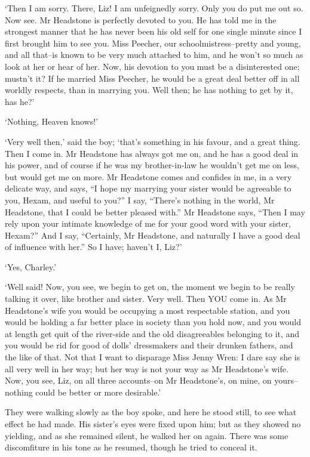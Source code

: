 ‘Then I am sorry. There, Liz! I am unfeignedly sorry. Only you do put me
out so. Now see. Mr Headstone is perfectly devoted to you. He has told
me in the strongest manner that he has never been his old self for one
single minute since I first brought him to see you. Miss Peecher, our
schoolmistress--pretty and young, and all that--is known to be very much
attached to him, and he won’t so much as look at her or hear of her.
Now, his devotion to you must be a disinterested one; mustn’t it? If he
married Miss Peecher, he would be a great deal better off in all worldly
respects, than in marrying you. Well then; he has nothing to get by it,
has he?’

‘Nothing, Heaven knows!’

‘Very well then,’ said the boy; ‘that’s something in his favour, and a
great thing. Then I come in. Mr Headstone has always got me on, and he
has a good deal in his power, and of course if he was my brother-in-law
he wouldn’t get me on less, but would get me on more. Mr Headstone
comes and confides in me, in a very delicate way, and says, “I hope my
marrying your sister would be agreeable to you, Hexam, and useful to
you?” I say, “There’s nothing in the world, Mr Headstone, that I could
be better pleased with.” Mr Headstone says, “Then I may rely upon your
intimate knowledge of me for your good word with your sister, Hexam?”
 And I say, “Certainly, Mr Headstone, and naturally I have a good deal of
influence with her.” So I have; haven’t I, Liz?’

‘Yes, Charley.’

‘Well said! Now, you see, we begin to get on, the moment we begin to
be really talking it over, like brother and sister. Very well. Then
YOU come in. As Mr Headstone’s wife you would be occupying a most
respectable station, and you would be holding a far better place in
society than you hold now, and you would at length get quit of the
river-side and the old disagreeables belonging to it, and you would be
rid for good of dolls’ dressmakers and their drunken fathers, and the
like of that. Not that I want to disparage Miss Jenny Wren: I dare
say she is all very well in her way; but her way is not your way as
Mr Headstone’s wife. Now, you see, Liz, on all three accounts--on
Mr Headstone’s, on mine, on yours--nothing could be better or more
desirable.’

They were walking slowly as the boy spoke, and here he stood still, to
see what effect he had made. His sister’s eyes were fixed upon him; but
as they showed no yielding, and as she remained silent, he walked her on
again. There was some discomfiture in his tone as he resumed, though he
tried to conceal it.

